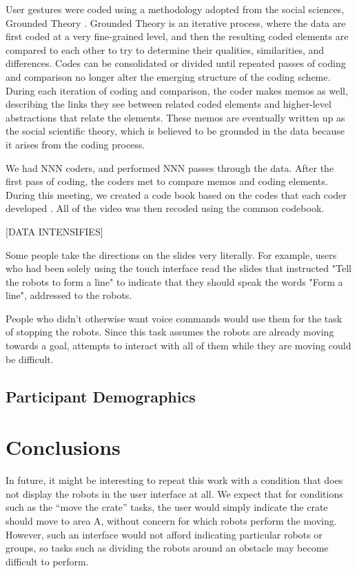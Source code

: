 \documentclass[]{article}
\begin{document}
User gestures were coded using a methodology adopted from the social sciences, Grounded Theory .
Grounded Theory is an iterative process, where the data are first coded at a very fine-grained level, and then the resulting coded elements are compared to each other to try to determine their qualities, similarities, and differences. 
Codes can be consolidated or divided until repeated passes of coding and comparison no longer alter the emerging structure of the coding scheme. 
During each iteration of coding and comparison, the coder makes memos as well, describing the links they see between related coded elements and higher-level abstractions that relate the elements. 
These memos are eventually written up as the social scientific theory, which is believed to be grounded in the data because it arises from the coding process. 

We had NNN coders, and performed NNN  passes through the data.
After the first pass of coding, the coders met to compare memos and coding elements. During this meeting, we created a code book based on the codes that each coder developed . All of the video was then recoded using the common codebook. 

[DATA INTENSIFIES]
 
Some people take the directions on the slides very literally. 
For example, users who had been solely using the touch interface read the slides that instructed "Tell the robots to form a line" to indicate that they should speak the words "Form a line", addressed to the robots.

People who didn't otherwise want voice commands would use them for the task of stopping the robots. 
Since this task assumes the robots are already moving towards a goal, attempts to interact with all of them while they are moving could be difficult. 

\subsection{Participant Demographics}

\section{Conclusions}

In future, it might be interesting to repeat this work with a condition that does not display the robots in the user interface at all. 
We expect that for conditions such as the ``move the crate'' tasks, the user would simply indicate the crate should move to area A, without concern for which robots perform the moving. 
However, such an interface would not afford indicating particular robots or groups, so tasks such as dividing the robots around an obstacle may become difficult to perform. 
\end{document}
